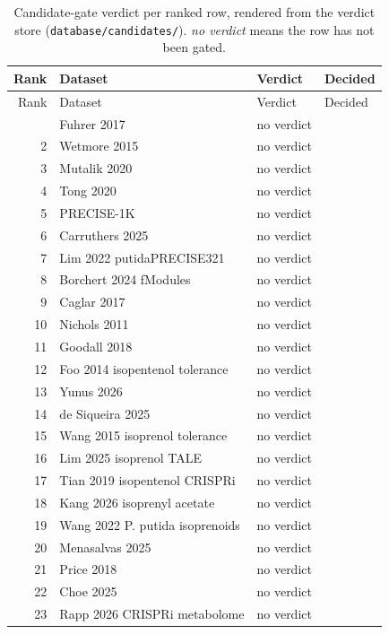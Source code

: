\begingroup
\footnotesize
\begin{longtable}{@{}r L{88mm} L{40mm} L{24mm}@{}}
\caption[]{Candidate-gate verdict per ranked row, rendered from the verdict store
(\texttt{database/candidates/}). \emph{no verdict} means the row has not been gated.}
\label{tab:bverdicts}\\
\toprule
Rank & Dataset & Verdict & Decided \\
\midrule
\endfirsthead
\toprule
Rank & Dataset & Verdict & Decided \\
\midrule
\endhead
\bottomrule
{} & Fuhrer 2017 & no verdict &  \\
2 & Wetmore 2015 & no verdict &  \\
3 & Mutalik 2020 & no verdict &  \\
4 & Tong 2020 & no verdict &  \\
5 & PRECISE-1K & no verdict &  \\
6 & Carruthers 2025 & no verdict &  \\
7 & Lim 2022 putidaPRECISE321 & no verdict &  \\
8 & Borchert 2024 fModules & no verdict &  \\
9 & Caglar 2017 & no verdict &  \\
10 & Nichols 2011 & no verdict &  \\
11 & Goodall 2018 & no verdict &  \\
12 & Foo 2014 isopentenol tolerance & no verdict &  \\
13 & Yunus 2026 & no verdict &  \\
14 & de Siqueira 2025 & no verdict &  \\
15 & Wang 2015 isoprenol tolerance & no verdict &  \\
16 & Lim 2025 isoprenol TALE & no verdict &  \\
17 & Tian 2019 isopentenol CRISPRi & no verdict &  \\
18 & Kang 2026 isoprenyl acetate & no verdict &  \\
19 & Wang 2022 P. putida isoprenoids & no verdict &  \\
20 & Menasalvas 2025 & no verdict &  \\
21 & Price 2018 & no verdict &  \\
22 & Choe 2025 & no verdict &  \\
23 & Rapp 2026 CRISPRi metabolome & no verdict &  \\

\end{longtable}
